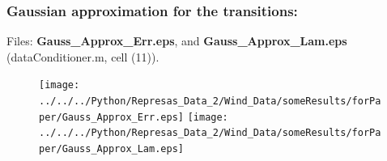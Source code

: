 \documentclass[aspectratio=169]{beamer}\usepackage[utf8]{inputenc}
\begin{document}
%
%
%
%
%
%
%
%
%
%


\begin{frame}\frametitle{Gaussian approximation for the transitions:}
Files: \textbf{Gauss\_Approx\_Err.eps}, and \textbf{Gauss\_Approx\_Lam.eps} (dataConditioner.m, cell (11)).
\begin{figure}[ht!]
\centering
\texttt{[image: ../../../Python/Represas\_Data\_2/Wind\_Data/someResults/forPaper/Gauss\_Approx\_Err.eps]}
\texttt{[image: ../../../Python/Represas\_Data\_2/Wind\_Data/someResults/forPaper/Gauss\_Approx\_Lam.eps]}
\end{figure}

\end{frame}
\end{document}

